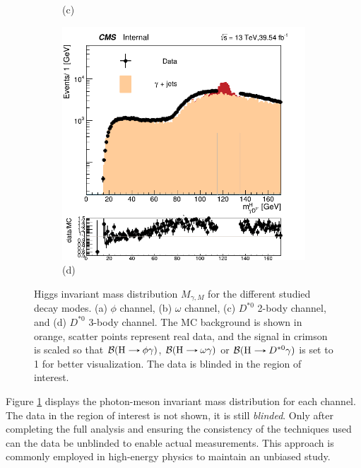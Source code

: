 \begin{figure}[!ht]
\begin{subfigure}[t]{0.50\mylength}
        \caption{\footnotesize (c)}
    \end{subfigure}%
    \begin{subfigure}[t]{0.50\mylength}
        \centering
        \includegraphics[width=0.45\mylength]{resources/plots/D0Star_3body_HiggsMass.png}
        \caption{\footnotesize (d)}
    \end{subfigure}%
\caption{Higgs invariant mass distribution $M_{\gamma, M}$ for the different studied decay modes. (a) $\phi$ channel, (b) $\omega$ channel, (c) $D^{*0}$ 2-body channel, and (d) $D^{*0}$ 3-body channel. The MC background is shown in orange, scatter points represent real data, and the signal in crimson is scaled so that $\mathcal{B}(\text{H}\protect\decaysto \phi\gamma)$, $\mathcal{B}(\text{H}\protect\decaysto \omega\gamma)$ or $\mathcal{B}(\text{H}\protect\decaysto D^{*0}\gamma)$ is set to 1 for better visualization. The data is blinded in the region of interest.}
\label{fig:Higgs_mass_data}
    \vspace*{-0.0cm}
\end{figure}

Figure \ref{fig:Higgs_mass_data} displays the photon-meson invariant mass distribution for each channel. The data in the region of interest is not shown, it is still \textit{blinded}. Only after completing the full analysis and ensuring the consistency of the techniques used can the data be unblinded to enable actual measurements. This approach is commonly employed in high-energy physics to maintain an unbiased study.

